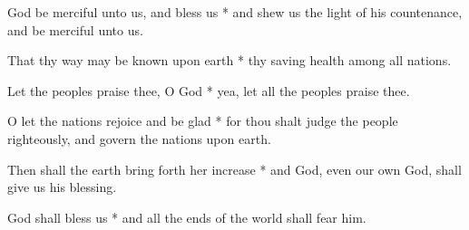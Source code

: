 God be merciful unto us, and bless us * and shew us the light of his countenance, and be merciful unto us.

That thy way may be known upon earth * thy saving health among all nations.

Let the peoples praise thee, O God * yea, let all the peoples praise thee.

O let the nations rejoice and be glad * for thou shalt judge the people righteously, and govern the nations upon earth.

Then shall the earth bring forth her increase * and God, even our own God, shall give us his blessing.

God shall bless us * and all the ends of the world shall fear him.